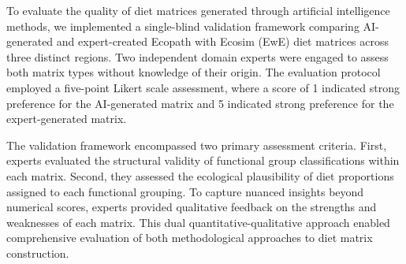 To evaluate the quality of diet matrices generated through artificial intelligence methods, we implemented a single-blind validation framework comparing AI-generated and expert-created Ecopath with Ecosim (EwE) diet matrices across three distinct regions. Two independent domain experts were engaged to assess both matrix types without knowledge of their origin. The evaluation protocol employed a five-point Likert scale assessment, where a score of 1 indicated strong preference for the AI-generated matrix and 5 indicated strong preference for the expert-generated matrix. 

The validation framework encompassed two primary assessment criteria. First, experts evaluated the structural validity of functional group classifications within each matrix. Second, they assessed the ecological plausibility of diet proportions assigned to each functional grouping. To capture nuanced insights beyond numerical scores, experts provided qualitative feedback on the strengths and weaknesses of each matrix. This dual quantitative-qualitative approach enabled comprehensive evaluation of both methodological approaches to diet matrix construction.
